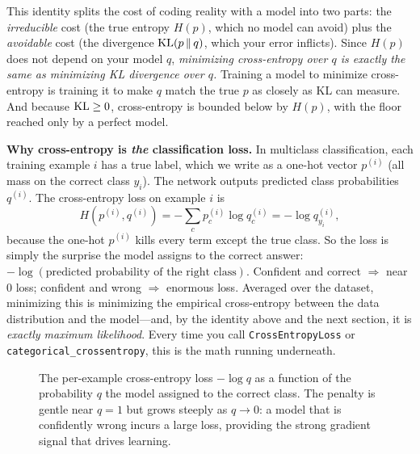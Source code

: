 \begin{aestheticbox}
This identity splits the cost of coding reality with a model into two parts: the
\emph{irreducible} cost (the true entropy $H(p)$, which no model can avoid) plus the
\emph{avoidable} cost (the divergence $\operatorname{KL}(p\,\|\,q)$, which your error inflicts). Since $H(p)$ does not
depend on your model $q$, \emph{minimizing cross-entropy over $q$ is exactly the same as minimizing KL
divergence over $q$.} Training a model to minimize cross-entropy is training it to make $q$ match the true
$p$ as closely as KL can measure. And because $\operatorname{KL} \ge 0$, cross-entropy is bounded below by $H(p)$, with
the floor reached only by a perfect model.
\end{aestheticbox}

\begin{applicationbox}
\textbf{Why cross-entropy is \emph{the} classification loss.} In multiclass classification, each training
example $i$ has a true label, which we write as a one-hot vector $p^{(i)}$ (all mass on the correct class
$y_i$). The network outputs predicted class probabilities $q^{(i)}$. The cross-entropy
loss on example $i$ is
\[
  H(p^{(i)}, q^{(i)}) = -\sum_c p^{(i)}_c \log q^{(i)}_c = -\log q^{(i)}_{y_i},
\]
because the one-hot $p^{(i)}$ kills every term except the true class. So the loss is simply the surprise
the model assigns to the correct answer: $-\log(\text{predicted probability of the right class})$. Confident
and correct $\Rightarrow$ near $0$ loss; confident and wrong $\Rightarrow$ enormous loss. Averaged over the
dataset, minimizing this is minimizing the empirical cross-entropy between the data distribution and the
model---and, by the identity above and the next section, it is \emph{exactly maximum likelihood}. Every
time you call \texttt{CrossEntropyLoss} or \texttt{categorical\_crossentropy}, this is the math running
underneath.
\end{applicationbox}

\begin{figure}[H]
\centering
{}
\caption{The per-example cross-entropy loss $-\log q$ as a function of the probability $q$ the model
assigned to the correct class. The penalty is gentle near $q=1$ but grows steeply as $q \to 0$: a model
that is confidently wrong incurs a large loss, providing the strong gradient signal that drives learning.}
\label{ch33:fig-crossentropy-loss}
\end{figure}

